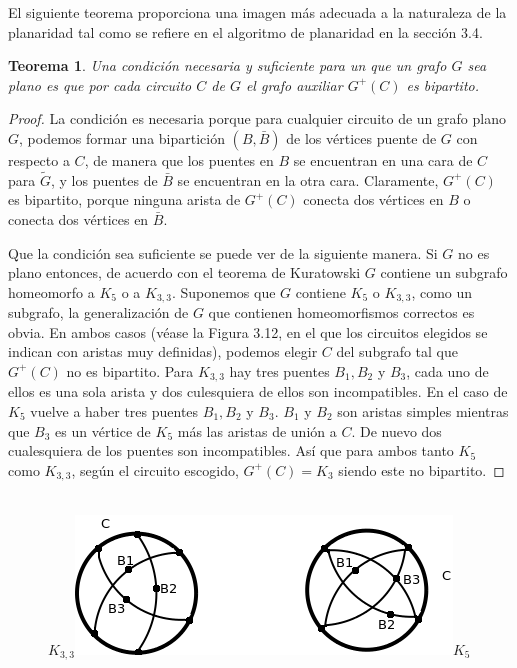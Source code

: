 \documentclass[10pt,a5paper]{book}
\newtheorem{teorema}{Teorema}[chapter]
\begin{document}
El siguiente teorema proporciona una imagen más adecuada a la naturaleza de la planaridad tal como se refiere en el algoritmo de planaridad en la sección 3.4.

\begin{teorema}
Una condición necesaria y suficiente para un que un grafo $G$ sea plano es que por cada circuito $C$ de $G$ el grafo auxiliar $G^+(C)$ es bipartito.
\end{teorema}
\begin{proof}
La condición es necesaria porque para cualquier circuito de un grafo plano $G$, podemos formar una bipartición $(B,\bar{B})$ de los vértices puente de $G$ con respecto a $C$, de manera que los puentes en $B$ se encuentran en una cara de $C$ para $\widetilde{G}$, y los puentes de $\bar{B}$ se encuentran en la otra cara. Claramente, $G^+(C)$ es bipartito, porque ninguna arista de $G^+(C)$ conecta dos vértices en $B$ o conecta dos vértices en $\bar{B}$.

Que la condición sea suficiente se puede ver de la siguiente manera. Si $G$ no es plano entonces, de acuerdo con el teorema de Kuratowski $G$ contiene un subgrafo homeomorfo a $K_5$ o a $K_{3,3}$. Suponemos que $G$ contiene $K_5$ o $K_{3,3}$, como un subgrafo, la generalización de $G$ que contienen homeomorfismos correctos es obvia. En ambos casos (véase la Figura 3.12, en el que los circuitos elegidos se indican con aristas muy definidas), podemos elegir $C$ del subgrafo tal que $G^+(C)$ no es bipartito. Para $K_{3,3}$ hay tres puentes $B_1, B_2$ y $B_3$, cada uno de ellos es una sola arista y dos culesquiera de ellos son incompatibles. En el caso de $K_5$ vuelve a haber tres puentes $B_1, B_2$ y $B_3$. $B_1$ y $B_2$ son aristas simples mientras que $B_3$ es un vértice de $K_5$ más las aristas de unión a $C$. De nuevo dos cualesquiera de los puentes son incompatibles. Así que para ambos tanto $K_5$ como $K_{3,3}$, según el circuito escogido, $G^+(C) = K_3$ siendo este no bipartito.
\end{proof}

\begin{figure}[H]
\caption{ }
\hrulefill{}\\
\hspace*{.2in}$K_{3,3}$\includegraphics[scale=.4]{Fig3_12.png}$K_5$
\end{figure}
\hrulefill{}\\
\end{document}
